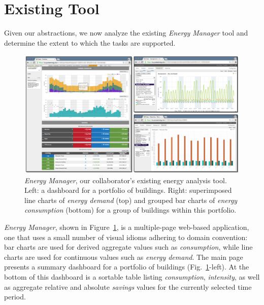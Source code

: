 \documentclass[journal]{vgtc}                %
\begin{document}

\section{Existing Tool}
\label{existing-tool}


Given our abstractions, we now analyze the existing {\it Energy Manager} tool and determine the extent to which the tasks are supported.

\begin{figure}[bp!]
    \vspace{-0.6cm}
	\centering
	\includegraphics[width=\textwidth]{figures/em.pdf}
	\vspace{-0.6cm}
	\caption{\textsl{Energy Manager}, our collaborator's existing energy analysis tool. Left: a dashboard for a portfolio of buildings. Right: superimposed line charts of \textsl{energy demand} (top) and grouped bar charts of \textsl{energy consumption} (bottom) for a group of buildings within this portfolio.}
	\label{fig:energy-manager}
\end{figure} 


{\it Energy Manager}, shown in Figure~\ref{fig:energy-manager}, is a multiple-page web-based application, one that uses a small number of visual idioms adhering to domain convention: bar charts are used for derived aggregate values such as {\it consumption}, while line charts are used for continuous values such as {\it energy demand}.
The main page presents a summary dashboard for a portfolio of buildings (Fig.~\ref{fig:energy-manager}-left). 
At the bottom of this dashboard is a sortable table listing {\it consumption}, {\it intensity}, as well as aggregate relative and absolute {\it savings} values for the currently selected time period. 
\end{document}
